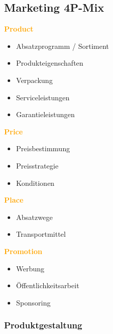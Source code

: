 \documentclass{article}
\begin{document}
\subsection{Marketing 4P-Mix}


\begin{multicols*}{4}
\textcolor {orange} {\textbf{Product}}
\begin{itemize}
	\item Absatzprogramm / Sortiment
	\item Produkteigenschaften
	\item Verpackung
	\item Serviceleistungen
	\item Garantieleistungen
\end{itemize}


\columnbreak
\textcolor {orange} {\textbf{Price}}
\begin{itemize}
	\item Preisbestimmung
	\item Preisstrategie
	\item Konditionen
\end{itemize}

\columnbreak
\textcolor {orange} {\textbf{Place}}
\begin{itemize}
	\item Absatzwege
	\item Transportmittel
\end{itemize}

\columnbreak
\textcolor {orange} {\textbf{Promotion}}
\begin{itemize}
	\item Werbung
	\item Öffentlichkeitsarbeit
	\item Sponsoring
\end{itemize}


\end{multicols*}



\subsubsection{Produktgestaltung}
\end{document}

